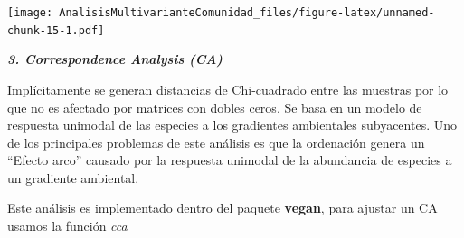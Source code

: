 \documentclass[]{book}
\newenvironment{Shaded}{\begin{snugshade}}{\end{snugshade}}
\newcommand{\KeywordTok}[1]{\textcolor[rgb]{0.13,0.29,0.53}{\textbf{{#1}}}}
\newcommand{\DataTypeTok}[1]{\textcolor[rgb]{0.13,0.29,0.53}{{#1}}}
\newcommand{\DecValTok}[1]{\textcolor[rgb]{0.00,0.00,0.81}{{#1}}}
\newcommand{\FloatTok}[1]{\textcolor[rgb]{0.00,0.00,0.81}{{#1}}}
\newcommand{\StringTok}[1]{\textcolor[rgb]{0.31,0.60,0.02}{{#1}}}
\newcommand{\CommentTok}[1]{\textcolor[rgb]{0.56,0.35,0.01}{\textit{{#1}}}}
\newcommand{\OtherTok}[1]{\textcolor[rgb]{0.56,0.35,0.01}{{#1}}}
\newcommand{\NormalTok}[1]{{#1}}
\begin{document}
\begin{Shaded}
\end{Shaded}

\texttt{[image: AnalisisMultivarianteComunidad\_files/figure-latex/unnamed-chunk-15-1.pdf]}

\textbf{\emph{3. Correspondence Analysis (CA)}}

Implícitamente se generan distancias de Chi-cuadrado entre las muestras
por lo que no es afectado por matrices con dobles ceros. Se basa en un
modelo de respuesta unimodal de las especies a los gradientes
ambientales subyacentes. Uno de los principales problemas de este
análisis es que la ordenación genera un ``Efecto arco'' causado por la
respuesta unimodal de la abundancia de especies a un gradiente
ambiental.

Este análisis es implementado dentro del paquete \textbf{vegan}, para
ajustar un CA usamos la función \emph{cca}

\begin{Shaded}
\end{Shaded}
\end{document}
